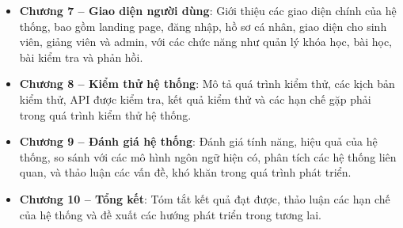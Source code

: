 \begin{itemize}
    \item \textbf{Chương 7 – Giao diện người dùng}: Giới thiệu các giao diện chính của hệ thống, bao gồm landing page, đăng nhập, hồ sơ cá nhân, giao diện cho sinh viên, giảng viên và admin, với các chức năng như quản lý khóa học, bài học, bài kiểm tra và phản hồi.
    
    \item \textbf{Chương 8 – Kiểm thử hệ thống}: Mô tả quá trình kiểm thử, các kịch bản kiểm thử, API được kiểm tra, kết quả kiểm thử và các hạn chế gặp phải trong quá trình kiểm thử hệ thống.
    
    \item \textbf{Chương 9 – Đánh giá hệ thống}: Đánh giá tính năng, hiệu quả của hệ thống, so sánh với các mô hình ngôn ngữ hiện có, phân tích các hệ thống liên quan, và thảo luận các vấn đề, khó khăn trong quá trình phát triển.
    
    \item \textbf{Chương 10 – Tổng kết}: Tóm tắt kết quả đạt được, thảo luận các hạn chế của hệ thống và đề xuất các hướng phát triển trong tương lai.
\end{itemize}


